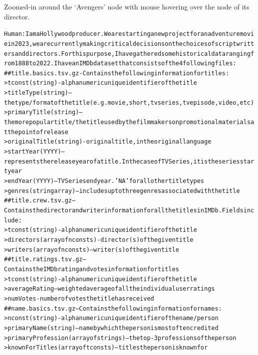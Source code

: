 \begin{tcolorbox}
\begin{minipage}[t]{0.4\linewidth}
\tiny Zoomed-in around the `Avengers' node with mouse hovering over the node of its director.
\end{minipage}
\tcbline
\parbox[t]{\linewidth}{\tiny\begin{alltt}
Human: I am a Hollywood producer. We are starting a new project for an adventure movie in 2023, we are currently making critical decisions on the choices of script writters and directors. For this purpose, I have gathered some historical data ranging from 1888 to 2022. I have an IMDb dataset that consists of the 4 following files:\\

\#\# title.basics.tsv.gz - Contains the following information for titles:\\
> tconst (string) - alphanumeric unique identifier of the title\\
> titleType (string) – the type/format of the title (e.g. movie, short, tvseries, tvepisode, video, etc)\\
> primaryTitle (string) – the more popular title / the title used by the filmmakers on promotional materials at the point of release\\
> originalTitle (string) - original title, in the original language\\
> startYear (YYYY) – represents the release year of a title. In the case of TV Series, it is the series start year\\
> endYear (YYYY) – TV Series end year. 'NA' for all other title types\\
> genres (string array) – includes up to three genres associated with the title\\
\#\# title.crew.tsv.gz – Contains the director and writer information for all the titles in IMDb. Fields include:\\
> tconst (string) - alphanumeric unique identifier of the title\\
> directors (array of nconsts) - director(s) of the given title\\
> writers (array of nconsts) – writer(s) of the given title\\
\#\# title.ratings.tsv.gz – Contains the IMDb rating and votes information for titles\\
> tconst (string) - alphanumeric unique identifier of the title\\
> averageRating – weighted average of all the individual user ratings\\
> numVotes - number of votes the title has received\\
\#\# name.basics.tsv.gz – Contains the following information for names:\\
> nconst (string) - alphanumeric unique identifier of the name/person\\
> primaryName (string)– name by which the person is most often credited\\
> primaryProfession (array of strings)– the top-3 professions of the person\\
> knownForTitles (array of tconsts) – titles the person is known for\\


\end{alltt}}
\end{tcolorbox}
